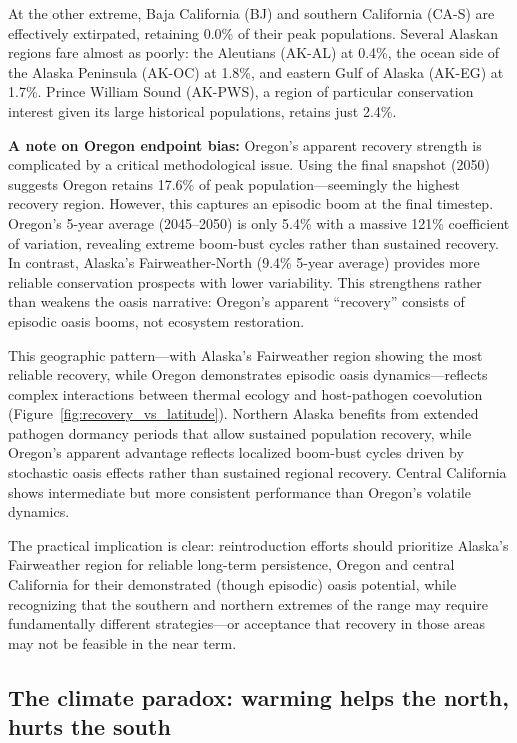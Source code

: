 At the other extreme, Baja California (BJ) and southern California (CA-S) are
effectively extirpated, retaining 0.0\% of their peak populations. Several
Alaskan regions fare almost as poorly: the Aleutians (AK-AL) at 0.4\%, the
ocean side of the Alaska Peninsula (AK-OC) at 1.8\%, and eastern Gulf of Alaska
(AK-EG) at 1.7\%. Prince William Sound (AK-PWS), a region of particular
conservation interest given its large historical populations, retains just 2.4\%.

\textbf{A note on Oregon endpoint bias:} Oregon's apparent recovery strength is 
complicated by a critical methodological issue. Using the final snapshot (2050) 
suggests Oregon retains 17.6\% of peak population---seemingly the highest recovery 
region. However, this captures an episodic boom at the final timestep. Oregon's 
5-year average (2045--2050) is only 5.4\% with a massive 121\% coefficient of 
variation, revealing extreme boom-bust cycles rather than sustained recovery. 
In contrast, Alaska's Fairweather-North (9.4\% 5-year average) provides more 
reliable conservation prospects with lower variability. This strengthens rather 
than weakens the oasis narrative: Oregon's apparent ``recovery'' consists of 
episodic oasis booms, not ecosystem restoration.

This geographic pattern---with Alaska's Fairweather region showing the most 
reliable recovery, while Oregon demonstrates episodic oasis dynamics---reflects 
complex interactions between thermal ecology and host-pathogen coevolution 
(Figure~\ref{fig:recovery_vs_latitude}). Northern Alaska benefits from extended 
pathogen dormancy periods that allow sustained population recovery, while Oregon's 
apparent advantage reflects localized boom-bust cycles driven by stochastic 
oasis effects rather than sustained regional recovery. Central California shows 
intermediate but more consistent performance than Oregon's volatile dynamics.

The practical implication is clear: reintroduction efforts should prioritize 
Alaska's Fairweather region for reliable long-term persistence, Oregon and 
central California for their demonstrated (though episodic) oasis potential, 
while recognizing that the southern and northern extremes of the range may
require fundamentally different strategies---or acceptance that recovery in those
areas may not be feasible in the near term.

\subsection{The climate paradox: warming helps the north, hurts the south}
\label{sec:findings_climate}

